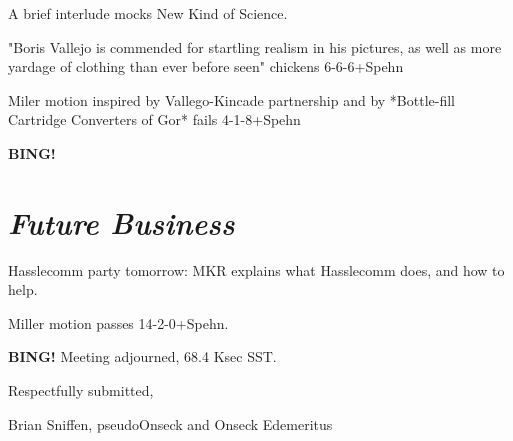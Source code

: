 \documentclass[10pt]{article}
\newcommand{\bing}{{\bf BING!} }
\newcommand{\goto}[1]{\bing \vskip 12pt \section*{{\em{#1}}}}
\newcommand{\onseck}{Brian Sniffen, pseudoOnseck and Onseck Edemeritus}
\begin{document}
A brief interlude mocks New Kind of Science.

"Boris Vallejo is commended for startling realism in his pictures, as
well as more yardage of clothing than ever before seen" chickens 6-6-6+Spehn

Miler motion inspired by Vallego-Kincade partnership and by
*Bottle-fill Cartridge Converters of Gor* fails 4-1-8+Spehn

\goto{Future Business}

Hasslecomm party tomorrow: MKR explains what Hasslecomm does, and how
to help.  

Miller motion passes 14-2-0+Spehn.

\bing
\noindent
Meeting adjourned, 68.4 Ksec SST.

\vspace{18pt}

\centerline{Respectfully submitted,}
\centerline{\onseck}
\end{document}
